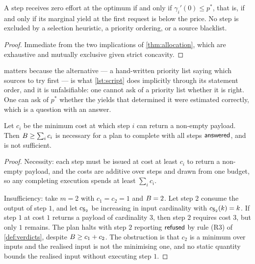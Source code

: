 \begin{corollary}
\label{cor:no-dropping-rule}
A step receives zero effort at the optimum if and only if
$\gamma_i'(0) \leq p^\ast$, that is, if and only if its marginal yield at the
first request is below the price. No step is excluded by a selection heuristic,
a priority ordering, or a source blacklist.
\end{corollary}

\begin{proof}
Immediate from the two implications of \cref{thm:allocation}, which are
exhaustive and mutually exclusive given strict concavity.
\end{proof}

 matters because the alternative --- a hand-written
priority list saying which sources to try first --- is what \cref{lst:script}
does implicitly through its statement order, and it is unfalsifiable: one
cannot ask of a priority list whether it is right. One can ask of $p^\ast$
whether the yields that determined it were estimated correctly, which is a
question with an answer.

\begin{proposition}
\label{prop:necessary-not-sufficient}
Let $c_i$ be the minimum cost at which step $i$ can return a non-empty payload.
Then $B \geq \sum_i c_i$ is necessary for a plan to complete with all steps
$\textsf{answered}$, and is not sufficient.
\end{proposition}

\begin{proof}
Necessity: each step must be issued at cost at least $c_i$ to return a
non-empty payload, and the costs are additive over steps and drawn from one
budget, so any completing execution spends at least $\sum_i c_i$.

Insufficiency: take $m=2$ with $c_1 = c_2 = 1$ and $B = 2$. Let step $2$
consume the output of step $1$, and let $c_{\mathsf{S}_2}$ be increasing in input
cardinality with $c_{\mathsf{S}_2}(k) = k$. If step $1$ at cost $1$ returns a
payload of cardinality $3$, then step $2$ requires cost $3$, but only $1$
remains. The plan halts with step $2$ reporting $\textsf{refused}$ by rule (R3) of
\cref{def:verdicts}, despite $B \geq c_1 + c_2$. The obstruction is that
$c_2$ is a minimum over inputs and the realised input is not the minimising
one, and no static quantity bounds the realised input without executing step
$1$.
\end{proof}

